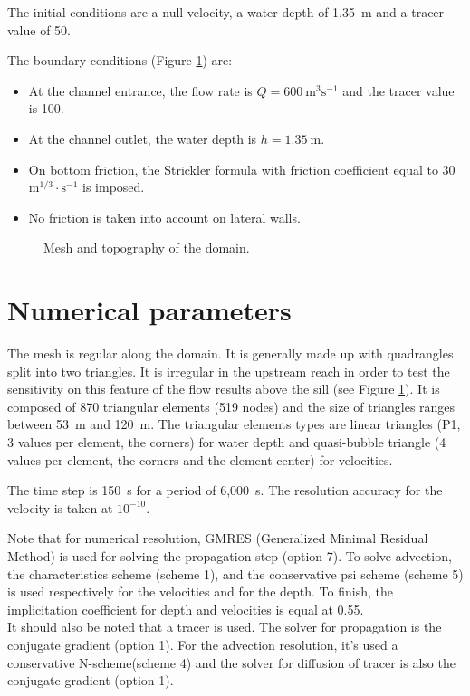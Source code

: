 \bigskip
The initial conditions are a null velocity, 
a water depth of 1.35~m and a tracer value of 50.

\bigskip
The boundary conditions (Figure \ref{t2d:weirs:fig:geo}) are:
\begin{itemize}
\item At the channel entrance, the flow rate is 
$Q = 600~\text{m}^3\text{s}^{-1}$ and the tracer value is 100.
\item At the channel outlet, the water depth is 
$h=1.35~\text{m}$. 
\item On  bottom friction, the Strickler formula 
with friction coefficient equal to 
30~$\text{m}^{1/3}\cdot\text{s}^{-1}$ is imposed.
\item No friction is taken into account on lateral walls.
\end{itemize}
\begin{figure}[!htbp]
 \centering
 \caption{Mesh and topography of the domain.}
 \label{t2d:weirs:fig:geo}
\end{figure}
\section{Numerical parameters}
\bigskip
The mesh is regular along the domain. It is generally made up 
with quadrangles split into two triangles. It is irregular in 
the upstream reach in order to test the sensitivity on this 
feature of the flow results above the sill (see Figure \ref{t2d:weirs:fig:geo}).
It is composed of 870 triangular elements (519 nodes) and 
the size of triangles ranges between 53~m and 120~m. The triangular 
elements types are linear triangles (P1, 3 values per element, the corners) 
for water depth and quasi-bubble triangle (4 values per element, the corners 
and the element center) for velocities.

\bigskip
The time step is 150~s for a period of 6,000~s. 
The resolution accuracy for the velocity is taken at $10^{-10}$.
 
\bigskip
Note that for numerical resolution, GMRES (Generalized Minimal Residual Method) 
is used for solving the propagation step (option 7). To solve advection, 
the characteristics scheme (scheme 1), and the conservative psi scheme (scheme 5)
is used respectively for the velocities and for the depth. To finish, 
the implicitation coefficient for depth and velocities is equal at 0.55.\\
It should also be noted that a tracer is used. The solver for 
propagation is the conjugate gradient (option 1). For the advection 
resolution, it's used a conservative N-scheme(scheme 4) and the solver 
for diffusion of tracer is also the conjugate gradient (option 1).

